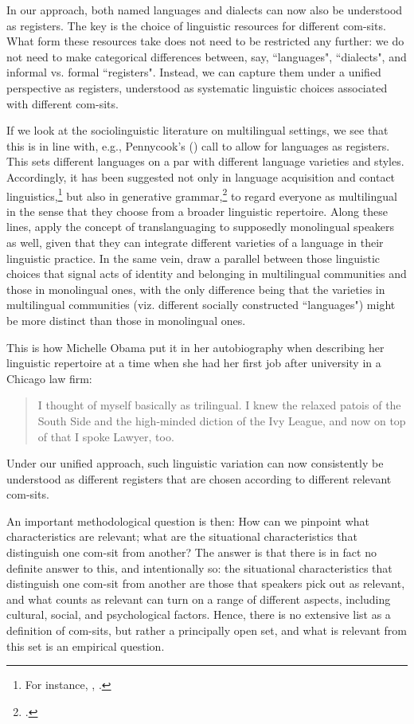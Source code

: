 In our approach, both named languages and dialects can now also be understood as registers. The key is the choice of linguistic resources for different com-sits. What form these resources take does not need to be restricted any further: we do not need to make categorical differences between, say, “languages", “dialects", and informal vs. formal “registers". Instead, we can capture them under a unified perspective as registers, understood as systematic linguistic choices associated with different com-sits.

If we look at the sociolinguistic literature on multilingual settings, we see that this is in line with, e.g., Pennycook’s (\citeyear{Pennycook2018}) call to allow for languages as registers. This sets different languages on a par with different language varieties and styles. Accordingly, it has been suggested not only in language acquisition and contact linguistics,\footnote{For instance, \citet{Tracy2014}, \citet{McSwann2017}.} but also in generative grammar,\footnote{\citet{Roeper1999}.} to regard everyone as multilingual in the sense that they choose from a broader linguistic repertoire. Along these lines, \citet{MontanariQuay2019} apply the concept of translanguaging to supposedly monolingual speakers as well, given that they can integrate different varieties of a language in their linguistic practice. In the same vein, \citet{PageTabouret-Keller2006} draw a parallel between those linguistic choices that signal acts of identity and belonging in multilingual communities and those in monolingual ones, with the only difference being that the varieties in multilingual communities (viz. different socially constructed “languages") might be more distinct than those in monolingual ones.

This is how Michelle Obama put it in her autobiography when describing her linguistic repertoire at a time when she had her first job after university in a Chicago law firm:

\begin{quote}
I thought of myself basically as trilingual. I knew the relaxed patois of the South Side and the high-minded diction of the Ivy League, and now on top of that I spoke Lawyer, too. \citep[94]{Obama2018}
\end{quote}

Under our unified approach, such linguistic variation can now consistently be understood as different registers that are chosen according to different relevant com-sits.

An important methodological question is then: How can we pinpoint what characteristics are relevant; what are the situational characteristics that distinguish one com-sit from another? The answer is that there is in fact no definite answer to this, and intentionally so: the situational characteristics that distinguish one com-sit from another are those that speakers pick out as relevant, and what counts as relevant can turn on a range of different aspects, including cultural, social, and psychological factors. Hence, there is no extensive list as a definition of com-sits, but rather a principally open set, and what is relevant from this set is an empirical question.

